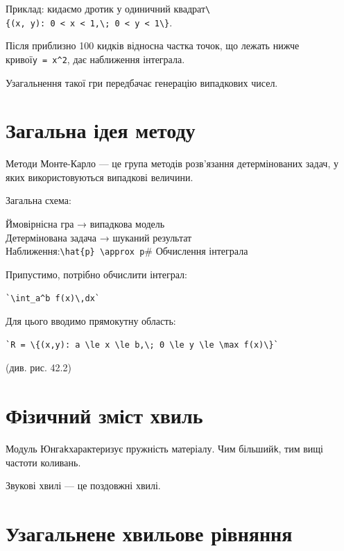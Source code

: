 \documentclass[
  ukrainian,
]{article}
\begin{document}
Приклад: кидаємо дротик у одиничний
квадрат\texttt{\textbackslash{}\{(x,\ y):\ 0\ \textless{}\ x\ \textless{}\ 1,\textbackslash{};\ 0\ \textless{}\ y\ \textless{}\ 1\textbackslash{}\}}.

Після приблизно 100 кидків відносна частка точок, що лежать нижче
кривої\texttt{y\ =\ x\^{}2}, дає наближення інтеграла.

Узагальнення такої гри передбачає генерацію випадкових чисел.

\section{Загальна ідея
методу}\label{ux437ux430ux433ux430ux43bux44cux43dux430-ux456ux434ux435ux44f-ux43cux435ux442ux43eux434ux443}

Методи Монте-Карло --- це група методів розв'язання детермінованих
задач, у яких використовуються випадкові величини.

Загальна схема:

Ймовірнісна гра → випадкова модель\\
Детермінована задача → шуканий результат\\
Наближення:\texttt{\textbackslash{}hat\{p\}\ \textbackslash{}approx\ p}\#
Обчислення інтеграла

Припустимо, потрібно обчислити інтеграл:

\begin{verbatim}
`\int_a^b f(x)\,dx`
\end{verbatim}

Для цього вводимо прямокутну область:

\begin{verbatim}
`R = \{(x,y): a \le x \le b,\; 0 \le y \le \max f(x)\}`
\end{verbatim}

(див. рис. 42.2)

\section{Фізичний зміст
хвиль}\label{ux444ux456ux437ux438ux447ux43dux438ux439-ux437ux43cux456ux441ux442-ux445ux432ux438ux43bux44c}

Модуль Юнга\texttt{k}характеризує пружність матеріалу. Чим
більший\texttt{k}, тим вищі частоти коливань.

Звукові хвилі --- це поздовжні хвилі.

\section{Узагальнене хвильове
рівняння}\label{ux443ux437ux430ux433ux430ux43bux44cux43dux435ux43dux435-ux445ux432ux438ux43bux44cux43eux432ux435-ux440ux456ux432ux43dux44fux43dux43dux44f}
\end{document}

